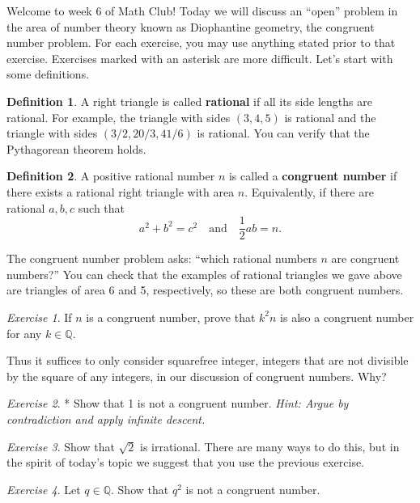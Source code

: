 \documentclass{article}
\theoremstyle{definition}
\newtheorem{definition}{Definition}%
\theoremstyle{remark}
\newtheorem{exercise}{Exercise}
\newcommand{\QQ}{\mathbb{Q}}
\begin{document}
Welcome to week 6 of Math Club!
Today we will discuss an ``open'' problem in the area of number theory known as Diophantine geometry, the congruent number problem.
For each exercise, you may use anything stated prior to that exercise.
Exercises marked with an asterisk are more difficult.
Let's start with some definitions.
\begin{definition}
    A right triangle is called \textbf{rational} if all its side lengths are rational.
    For example, the triangle with sides \((3,4,5)\) is rational and the triangle with sides \((3/2,20/3,41/6)\) is rational.
    You can verify that the Pythagorean theorem holds.
\end{definition}

\begin{definition}
    A positive rational number \(n\) is called a \textbf{congruent number} if there exists a rational right triangle with area \(n\).
    Equivalently, if there are rational \(a,b,c\) such that 
   \[a^2+b^2=c^2\quad\text{and}\quad \frac{1}{2}ab=n.\]
\end{definition}

The congruent number problem asks: ``which rational numbers \(n\) are congruent numbers?''
You can check that the examples of rational triangles we gave above are triangles of area 6 and 5, respectively, so these are both congruent numbers.

\begin{exercise}
    If \(n\) is a congruent number, prove that \(k^2n\) is also a congruent number for any \(k\in\QQ\).
\end{exercise}

Thus it suffices to only consider squarefree integer, integers that are not divisible by the square of any integers, in our discussion of congruent numbers. Why?

\begin{exercise}*
    Show that 1 is not a congruent number.
    {\it Hint: Argue by contradiction and apply infinite descent.}
\end{exercise}

\begin{exercise}
    Show that \(\sqrt{2}\) is irrational.
	There are many ways to do this, but in the spirit of today's topic we suggest that you use the previous exercise.
\end{exercise}

\begin{exercise}
    Let \(q\in\QQ\).
    Show that \(q^2\) is not a congruent number.
\end{exercise}
\end{document}
